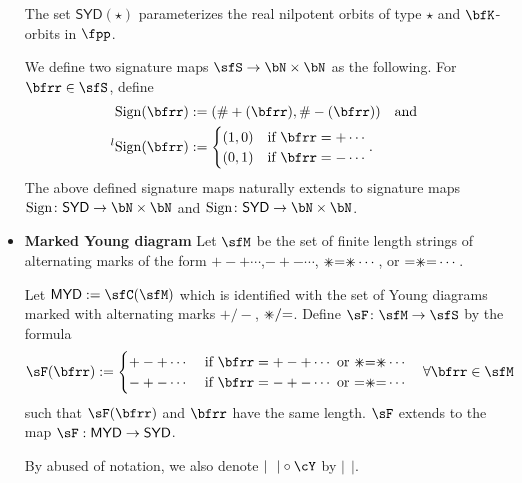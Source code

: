 \documentclass[12pt,a4paper]{amsart}
\def\SYD{{\mathsf{SYD}}}
\def\MYD{{\mathsf{MYD}}}
\def\abs#1{\left|{#1}\right|}
\numberwithin{equation}{section}
\theoremstyle{remark}
\def\lsign{{}^l\mathrm{Sign}}
\def\ssign{\mathrm{Sign}}
\def\umm{{=}}
\def\upp{{\ast}}
\def\upp{
  {{\setbox0\hbox{$\times$}
      \rlap{\hbox to \wd0{\hss$+$\hss}}\box0
    }}
}
\begin{document}
\begin{itemize}
        The set $\SYD(\star)$ parameterizes the real nilpotent orbits of type
        $\star$ and $\bfK$-orbits in $\fpp$.

        We define two signature maps $\sfS\rightarrow \bN\times \bN$ as the
        following. For $\bfrr\in \sfS$, define
        \[
        \begin{split}
          \ssign(\bfrr)& := (\#+(\bfrr), \#-(\bfrr)) \quad \text{and}\\
          \lsign(\bfrr)& := \begin{cases}
            (1,0) & \text{if } \bfrr = +\cdots\\
            (0,1) & \text{if } \bfrr = -\cdots\\
          \end{cases}.
        \end{split}
        \]
        The above defined signature maps naturally extends to signature maps
        $\ssign\colon \SYD\rightarrow \bN\times \bN$ and
        $\ssign\colon \SYD\rightarrow \bN\times \bN$.



  \item {\bf Marked Young diagram} Let $\sfM$ be the set of finite length
        strings of alternating marks of the form $+-+\cdots$,$-+-\cdots$,
        $\upp\umm\upp\cdots$, or $\umm\upp\umm\cdots$.

        Let $\MYD:=\sfC(\sfM)$ which is identified with the set of Young
        diagrams marked with alternating marks $+/-$, $\upp/\umm$. Define
        $\sF\colon \sfM \rightarrow \sfS$ by the formula
        \[
        \sF(\bfrr) := \begin{cases}
          +-+\cdots & \text{ if } \bfrr = +-+\cdots \text{ or } \upp\umm\upp\cdots\\
          -+-\cdots & \text{ if } \bfrr = -+-\cdots \text{ or } \umm\upp\umm\cdots\\
        \end{cases} \quad \forall \bfrr\in \sfM
        \]
        such that $\sF(\bfrr)$ and $\bfrr$ have the same length. $\sF$ extends
        to the map $\sF: \MYD \rightarrow \SYD$.

        By abused of notation, we also denote $\abs{\ \ }\circ \cY$ by
        $\abs{\ \ }$.


\end{itemize}
\end{document}
